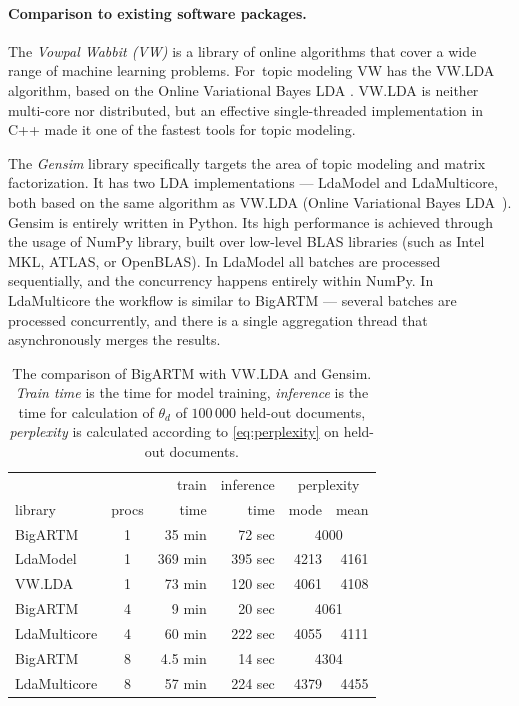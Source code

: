 \documentclass[russian,english]{llncs}
\begin{document}
\paragraph{Comparison to existing software packages.}

The \emph{Vowpal Wabbit (VW)} is a library
of online algorithms that cover a wide range of machine learning problems. %
For~topic modeling VW has the VW.LDA algorithm, based on the Online Variational Bayes LDA \cite{hoffman10online}.
VW.LDA is neither multi-core nor distributed,
but an effective single-threaded implementation in C++ made it one of the fastest tools for topic modeling.%

The \emph{Gensim} library specifically targets the area of topic modeling and matrix factorization.
It has two LDA implementations --- LdaModel and LdaMulticore,
both based on the same algorithm as VW.LDA (Online Variational Bayes LDA~\cite{hoffman10online}).
Gensim is entirely written in Python. Its high performance is achieved through the usage of NumPy library,
built over low-level BLAS libraries (such as Intel MKL, ATLAS, or OpenBLAS).
In LdaModel all batches are processed sequentially, and the concurrency happens entirely within NumPy. %
In LdaMulticore the workflow is similar to BigARTM --- several batches are processed concurrently, and there is a single aggregation thread that asynchronously merges the results.

\begin{table}[t]
	\caption{
        The comparison of BigARTM with VW.LDA and Gensim.
        \emph{Train time} is the time for model training,
        \emph{inference} is the time for calculation of $\theta_d$ of $100\,000$ held-out documents,
        \emph{perplexity} is calculated according to \eqref{eq:perplexity} on held-out documents.
    }
	\label{tab:libraries_comparison}
    \centering\tabcolsep=4.3pt
	\begin{tabular}[t]{l|c|rrrr}
	\hline
	& & train & inference & \multicolumn{2}{c}{perplexity} \\
	library & procs & time & time & mode & mean \\
	\hline
	BigARTM & 1 & 35 min & 72 sec & \multicolumn{2}{c}{4000} \\
	LdaModel & 1 & 369 min & 395 sec & 4213 & 4161  \\
	VW.LDA & 1 & 73 min & 120 sec & 4061 & 4108 \\
	\hline
	BigARTM & 4 & 9 min & 20 sec & \multicolumn{2}{c}{4061}  \\
	LdaMulticore & 4 & 60 min & 222 sec & 4055 & 4111  \\	
	\hline
	BigARTM & 8 & 4.5 min & 14 sec & \multicolumn{2}{c}{4304}  \\
	LdaMulticore & 8 & 57 min & 224 sec & 4379 & 4455 \\
	\hline
	\end{tabular}
\end{table}
\end{document}
